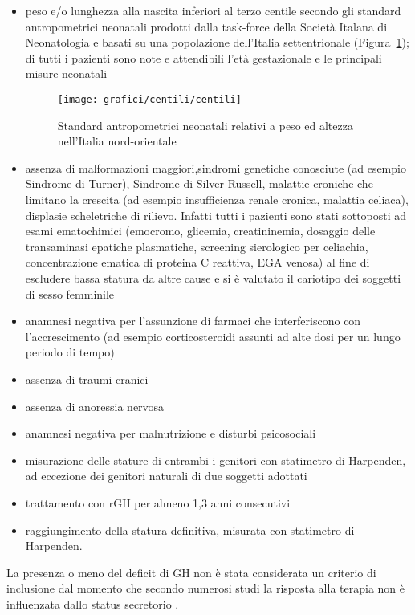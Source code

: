 \begin{itemize}
\item peso e/o lunghezza alla nascita inferiori al terzo centile secondo gli standard antropometrici neonatali prodotti dalla task-force della Società Italana di Neonatologia e basati su una popolazione dell'Italia settentrionale\cite{standard} (Figura~\ref{fig:StandardNeonataliNordOccidentali}); di tutti i pazienti sono note e attendibili l'età gestazionale e le principali misure neonatali
\begin{figure}[!h]
  \begin{center}
      \texttt{[image: grafici/centili/centili]} %
  \end{center}
  \caption{Standard antropometrici neonatali relativi a peso ed altezza nell'Italia nord-orientale}
  \label{fig:StandardNeonataliNordOccidentali}
\end{figure}
\item assenza di malformazioni maggiori,sindromi genetiche conosciute (ad esempio Sindrome di Turner), Sindrome di Silver Russell, malattie croniche che limitano la crescita (ad esempio insufficienza renale cronica, malattia celiaca), displasie scheletriche di rilievo. Infatti tutti i pazienti sono stati sottoposti ad esami ematochimici (emocromo, glicemia, creatininemia, dosaggio delle transaminasi epatiche plasmatiche, screening sierologico per celiachia, concentrazione ematica di proteina C reattiva, EGA venosa) al fine di escludere bassa statura da altre cause e si è valutato il cariotipo dei soggetti di sesso femminile
 \item anamnesi negativa per l'assunzione di farmaci che interferiscono con l'accrescimento (ad esempio corticosteroidi assunti ad alte dosi per un lungo periodo di tempo)
 \item assenza di traumi cranici
 \item assenza di anoressia nervosa
 \item anamnesi negativa per malnutrizione e disturbi psicosociali
 \item misurazione delle stature di entrambi i genitori con statimetro di Harpenden, ad eccezione dei genitori naturali di due soggetti adottati
\item trattamento con rGH per almeno 1,3 anni consecutivi
\item raggiungimento della statura definitiva, misurata con statimetro di Harpenden. 
\end{itemize}

La presenza o meno del deficit di GH non è stata considerata un criterio di inclusione dal momento che secondo numerosi studi la risposta alla terapia non è influenzata dallo status secretorio\cite{sas1999growth} \cite{van2003adult}.


